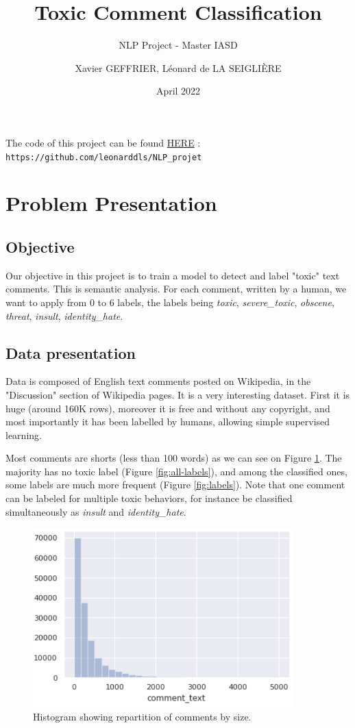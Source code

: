 \documentclass[11pt]{scrartcl}
\title{Toxic Comment Classification}
\subtitle{NLP Project - Master IASD}
\author{Xavier GEFFRIER, Léonard de LA SEIGLIÈRE}
\date{April 2022}
\begin{document}
\maketitle

The code of this project can be found \href{https://github.com/leonarddls/NLP_projet}{HERE} : \texttt{https://github.com/leonarddls/NLP\_projet}



\section{Problem Presentation}

\subsection{Objective}

Our objective in this project is to train a model to detect and label "toxic" text comments. This is semantic analysis. For each comment, written by a human, we want to apply from 0 to 6 labels, the labels being \textit{toxic}, \textit{severe\_toxic}, \textit{obscene}, \textit{threat}, \textit{insult}, \textit{identity\_hate}.

\subsection{Data presentation}

Data is composed of English text comments posted on Wikipedia, in  the "Discussion" section of Wikipedia pages. It is a very interesting dataset. First it is huge (around 160K rows), moreover it is free and without any copyright, and most importantly it has been labelled by humans, allowing simple supervised learning.

Most comments are shorts (less than 100 words) as we can see on Figure \ref{fig:sizes}. The majority has no toxic label (Figure \ref{fig:all-labels}), and among the classified ones, some labels are much more frequent (Figure \ref{fig:labels}). Note that one comment can be labeled for multiple toxic behaviors, for instance be classified simultaneously as \textit{insult} and \textit{identity\_hate}.

\begin{figure}[H]
    \centering
    \includegraphics[width=10cm]{img/size.PNG}
    \caption{Histogram showing repartition of comments by size.}
    \label{fig:sizes}
\end{figure}
\end{document}
